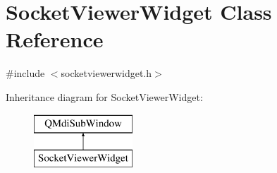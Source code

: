 \hypertarget{class_socket_viewer_widget}{}\section{Socket\+Viewer\+Widget Class Reference}
\label{class_socket_viewer_widget}


{\ttfamily \#include $<$socketviewerwidget.\+h$>$}

Inheritance diagram for Socket\+Viewer\+Widget\+:\begin{figure}[H]
\begin{center}
\leavevmode
\includegraphics[height=2.000000cm]{class_socket_viewer_widget}
\end{center}
\end{figure}
